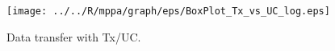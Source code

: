 \documentclass[conference,compsoc]{IEEEtran}
\begin{document}
\begin{figure}[t]
  \centering
  \texttt{[image: ../../R/mppa/graph/eps/BoxPlot\_Tx\_vs\_UC\_log.eps]}
  \vspace{-2mm}
  \caption{\label{fig:tx_uc_log}
    Data transfer with Tx/UC. }
  \vspace{-4mm}
\end{figure}

\end{document}
